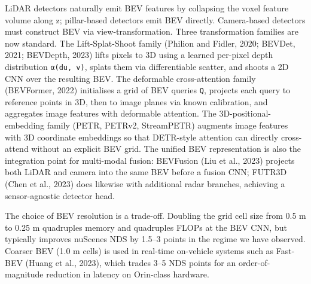 LiDAR detectors naturally emit BEV features by collapsing the voxel feature volume along z; pillar-based detectors emit BEV directly. Camera-based detectors must construct BEV via view-transformation. Three transformation families are now standard. The Lift-Splat-Shoot family (Philion and Fidler, 2020; BEVDet, 2021; BEVDepth, 2023) lifts pixels to 3D using a learned per-pixel depth distribution \texttt{α(d\textbar{}u,\ v)}, splats them via differentiable scatter, and shoots a 2D CNN over the resulting BEV. The deformable cross-attention family (BEVFormer, 2022) initialises a grid of BEV queries \texttt{Q}, projects each query to reference points in 3D, then to image planes via known calibration, and aggregates image features with deformable attention. The 3D-positional-embedding family (PETR, PETRv2, StreamPETR) augments image features with 3D coordinate embeddings so that DETR-style attention can directly cross-attend without an explicit BEV grid. The unified BEV representation is also the integration point for multi-modal fusion: BEVFusion (Liu et al., 2023) projects both LiDAR and camera into the same BEV before a fusion CNN; FUTR3D (Chen et al., 2023) does likewise with additional radar branches, achieving a sensor-agnostic detector head.

The choice of BEV resolution is a trade-off. Doubling the grid cell size from 0.5 m to 0.25 m quadruples memory and quadruples FLOPs at the BEV CNN, but typically improves nuScenes NDS by 1.5--3 points in the regime we have observed. Coarser BEV (1.0 m cells) is used in real-time on-vehicle systems such as Fast-BEV (Huang et al., 2023), which trades 3--5 NDS points for an order-of-magnitude reduction in latency on Orin-class hardware.

